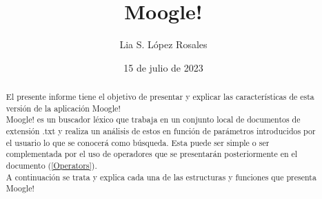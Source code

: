\documentclass[options]{article}
\title{Moogle!}
\author{Lia S. López Rosales}
\date{15 de julio de 2023}
\begin{document}
\maketitle
\begin{abstract}
El presente informe tiene el objetivo de presentar y explicar las características de esta versión de la aplicación Moogle!\\ 
Moogle! es un buscador léxico que trabaja en un conjunto local de documentos de extensión .txt y realiza un análisis de estos en función de parámetros introducidos por el usuario lo que se conocerá como búsqueda. Esta puede ser simple o ser complementada por el uso de operadores que se presentarán posteriormente en el documento (\ref{Operators}). \\
A continuación se trata y explica cada una de las estructuras y funciones que presenta Moogle!
\end{abstract}
\end{document}
